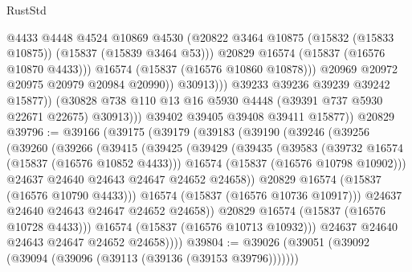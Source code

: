 \begin{lexlean}{RustStd}
\begin{coremodule}
                              @4433
                              @4448
                              @4524
                              @10869
                              @4530
                              (@20822
                                @3464
                                @10875
                                (@15832 (@15833 @10875))
                                (@15837 (@15839 @3464 @53)))
                              @20829
                              @16574
                              (@15837 (@16576 @10870 @4433)))
                            @16574
                            (@15837 (@16576 @10860 @10878)))
                          @20969
                          @20972
                          @20975
                          @20979
                          @20984
                          @20990))
                      @30913)))
                @39233
                @39236
                @39239
                @39242
                @15877))
            (@30828 @738 @110 @13 @16 @5930 @4448 (@39391 @737 @5930 @22671 @22675) @30913)))
        @39402
        @39405
        @39408
        @39411
        @15877))
    @20829
@39796 := @39166
    (@39175
      (@39179
        (@39183
          (@39190
            (@39246
              (@39256
                (@39260
                  (@39266
                    (@39415
                      (@39425
                        (@39429
                          (@39435
                            (@39583
                              (@39732 @16574 (@15837 (@16576 @10852 @4433)))
                              @16574
                              (@15837 (@16576 @10798 @10902)))
                            @24637
                            @24640
                            @24643
                            @24647
                            @24652
                            @24658))
                        @20829
                        @16574
                        (@15837 (@16576 @10790 @4433)))
                      @16574
                      (@15837 (@16576 @10736 @10917)))
                    @24637
                    @24640
                    @24643
                    @24647
                    @24652
                    @24658))
                @20829
                @16574
                (@15837 (@16576 @10728 @4433)))
              @16574
              (@15837 (@16576 @10713 @10932)))
            @24637
            @24640
            @24643
            @24647
            @24652
            @24658))))
@39804 := @39026 (@39051 (@39092 (@39094 (@39096 (@39113 (@39136 (@39153 @39796)))))))

\end{coremodule}
\end{lexlean}
